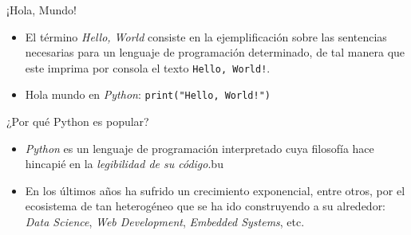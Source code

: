 \documentclass{beamer}
\begin{document}
    \begin{frame}{¡Hola, Mundo!}
      \noindent
      \begin{minipage}{.69\textwidth}
        \begin{itemize}
          \item El término \emph{Hello, World} consiste en la ejemplificación sobre las sentencias necesarias para un lenguaje de programación determinado, de tal manera que este imprima por consola el texto \texttt{Hello, World!}.
          \item Hola mundo en \emph{Python}: \texttt{print("Hello, World!")}
        \end{itemize}
      \end{minipage}
      \begin{minipage}{.29\textwidth}
          \begin{center}
            \fontsize{40}{50}
          \end{center}
      \end{minipage}
    \end{frame}

    \begin{frame}{¿Por qué Python es popular?}
        \noindent
        \begin{minipage}{.29\textwidth}
            \begin{center}
              \fontsize{40}{50}
            \end{center}
        \end{minipage}
        \begin{minipage}{.69\textwidth}
          \begin{itemize}
            \item \emph{Python} es un lenguaje de programación interpretado cuya filosofía hace hincapié en la \emph{legibilidad de su código}.​ bu
            \item En los últimos años ha sufrido un crecimiento exponencial, entre otros, por el ecosistema de tan heterogéneo que se ha ido construyendo a su alrededor: \emph{Data Science}, \emph{Web Development}, \emph{Embedded Systems}, etc.
          \end{itemize}
        \end{minipage}
    \end{frame}
\end{document}
